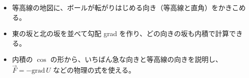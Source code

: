 \newcommand\kviiiemt[2][]{\draw[kviiie contour, #1] (0,0) ellipse ({10*sqrt(100-#2)} and {10*sqrt((100-#2)/2)});}
\newcommand\kviiieball[2]{\filldraw[fill=bkYellow!60, draw=bkInk, line width=0.7pt] #1 circle[radius=#2];
  \fill[white] ($#1+(-0.3*#2,0.3*#2)$) circle[radius=0.28*#2];}
\newcommand\kviiieright[3]{\draw[bkInk, line width=0.6pt] ($#1+(#2:2.6mm)$) -- ($#1+(#2:2.6mm)+(#3:2.6mm)$) -- ($#1+(#3:2.6mm)$);}
\makeatother


\begin{goal}
\begin{itemize}[label={\color{\bkTT}●}, leftmargin=1.6\zw, itemsep=0pt, topsep=1pt]
\item {}\enspace 等高線の地図に、ボールが転がりはじめる向き（等高線と直角）をかきこめる。
\item {}\enspace 東の坂と北の坂を並べて勾配 grad を作り、どの向きの坂も内積で計算できる。
\item {}\enspace 内積の $\cos$ の形から、いちばん急な向きと等高線の向きを説明し、$\vec F=-\mathrm{grad}\,U$ などの物理の式を使える。
\end{itemize}
\end{goal}

